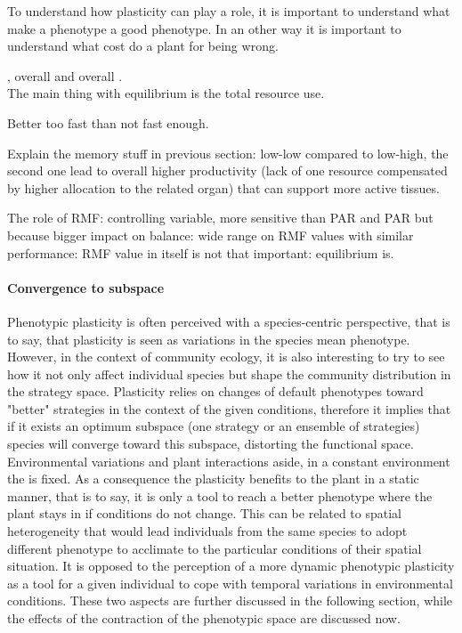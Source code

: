 To understand how plasticity can play a role, it is important to understand what make a phenotype a good phenotype. In an other way it is important to understand what cost do a plant for being wrong.

, overall  and overall .\\
The main thing with equilibrium is the total resource use.

Better too fast than not fast enough.

Explain the memory stuff in previous section: low-low compared to low-high, the second one lead to overall higher productivity (lack of one resource compensated by higher allocation to the related organ) that can support more active tissues. 

The role of RMF: controlling variable, more sensitive than PAR and PAR but because bigger impact on balance: wide range on RMF values with similar performance: RMF value in itself is not that important: equilibrium is.

\paragraph{Convergence to subspace}

Phenotypic plasticity is often perceived with a species-centric perspective, that is to say, that plasticity is seen as variations in the species mean phenotype. However, in the context of community ecology, it is also interesting to try to see how it not only affect individual species but shape the community distribution in the strategy space. Plasticity relies on changes of default phenotypes toward "better" strategies in the context of the given conditions, therefore it implies that if it exists an optimum subspace (one strategy or an ensemble of strategies) species will converge toward this subspace, distorting the functional space. Environmental variations and plant interactions aside, in a constant environment the  is fixed. As a consequence the plasticity benefits to the plant in a static manner, that is to say, it is only a tool to reach a better phenotype where the plant stays in if conditions do not change. This can be related to spatial heterogeneity that would lead individuals from the same species to adopt different phenotype to acclimate to the particular conditions of their spatial situation. It is opposed to the perception of a more dynamic phenotypic plasticity as a tool for a given individual to cope with temporal variations in environmental conditions. These two aspects are further discussed in the following section, while the effects of the contraction of the phenotypic space are discussed now.

